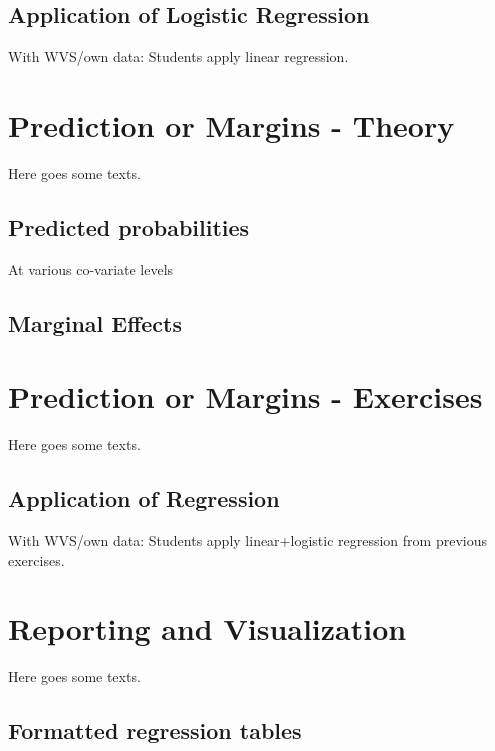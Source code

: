 \documentclass[
]{book}
\begin{document}
\hypertarget{application-of-logistic-regression}{%
\section{Application of Logistic Regression}\label{application-of-logistic-regression}}

With WVS/own data: Students apply linear regression.

\hypertarget{pm-t}{%
\chapter{Prediction or Margins - Theory}\label{pm-t}}

Here goes some texts.

\hypertarget{predicted-probabilities}{%
\section{Predicted probabilities}\label{predicted-probabilities}}

At various co-variate levels

\hypertarget{marginal-effects}{%
\section{Marginal Effects}\label{marginal-effects}}

\hypertarget{pm-e}{%
\chapter{Prediction or Margins - Exercises}\label{pm-e}}

Here goes some texts.

\hypertarget{application-of-regression}{%
\section{Application of Regression}\label{application-of-regression}}

With WVS/own data: Students apply linear+logistic regression from previous exercises.

\hypertarget{report-v}{%
\chapter{Reporting and Visualization}\label{report-v}}

Here goes some texts.

\hypertarget{formatted-regression-tables}{%
\section{Formatted regression tables}\label{formatted-regression-tables}}
\end{document}
